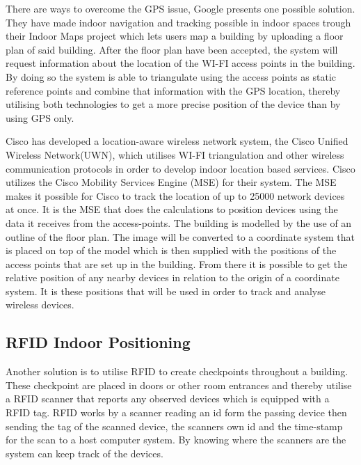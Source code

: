 There are ways to overcome the GPS issue, Google presents one possible solution. They have made indoor navigation and tracking possible in indoor spaces trough their Indoor Maps project \cite{IPSoverGPS} which lets users map a building by uploading a floor plan of said building. After the floor plan have been accepted, the system will request information about the location of the WI-FI access points in the building. By doing so the system is able to triangulate using the access points as static reference points and combine that information with the GPS location, thereby utilising both technologies to get a more precise position of the device than by using GPS only.

Cisco has developed a location-aware wireless network system, the Cisco Unified Wireless Network(UWN), which utilises WI-FI triangulation\cite{CiscoTri} and other wireless communication protocols in order to develop indoor location based services\cite{uwn}.
Cisco utilizes the Cisco Mobility Services Engine (MSE) for their system. The MSE makes it possible for Cisco to track the location of up to 25000 network devices at once. It is the MSE that does the calculations to position devices using the data it receives from the access-points\cite{ciscoMSE}.
The building is modelled by the use of an outline of the floor plan. The image will be converted to a coordinate system that is placed on top of the model which is then supplied with the positions of the access points that are set up in the building. From there it is possible to get the relative position of any nearby devices in relation to the origin of a coordinate system. It is these positions that will be used in order to track and analyse wireless devices.

\subsection{RFID Indoor Positioning}
Another solution is to utilise RFID to create checkpoints throughout a building. These checkpoint are placed in doors or other room entrances and thereby utilise a RFID scanner that reports any observed devices which is equipped with a RFID tag\cite{indoor_bin}. 
RFID works by a scanner reading an id form the passing device then sending the tag of the scanned device, the scanners own id and the time-stamp for the scan to a host computer system. By knowing where the scanners are the system can keep track of the devices\cite{RFIDjournal}.

